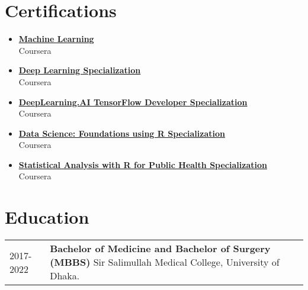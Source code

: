\documentclass[12pt]{article}
\begin{document}
\section{Certifications}
\begin{itemize}
	\itemsep=-1em
	\item \textbf{\href{https://www.coursera.org/account/accomplishments/certificate/7LCZV4CYREMK}{Machine Learning}}\\
	Coursera \\
	\item \textbf{\href{https://www.coursera.org/account/accomplishments/specialization/certificate/FQJXRTBU7GRL}{Deep Learning Specialization}}\\
	Coursera \\
	\item \textbf{\href{https://www.coursera.org/account/accomplishments/specialization/certificate/ZQ9Q3JFQVVLZ}{DeepLearning.AI TensorFlow Developer Specialization}}\\
	Coursera \\
	\item \textbf{\href{https://www.coursera.org/account/accomplishments/specialization/certificate/XSYRWDUNPTHQ}{Data Science: Foundations using R Specialization}}\\
	Coursera \\
	\item \textbf{\href{https://www.coursera.org/account/accomplishments/specialization/certificate/XWEVAHPHHPWH}{Statistical Analysis with R for Public Health Specialization}}\\
	Coursera \\

\end{itemize}

\section{Education}
\begin{tabular}{ l p{15in} }
    2017-2022 & \textbf{Bachelor of Medicine and Bachelor of Surgery (MBBS)}
     \newline Sir Salimullah Medical College,\newline
     University of Dhaka. \\
\end{tabular}
\end{document}
